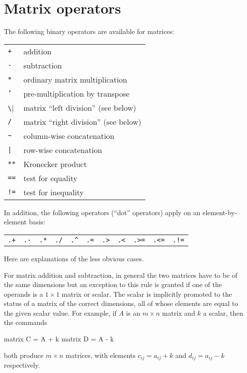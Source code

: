 \section{Matrix operators}
\label{matrix-op}

The following binary operators are available for matrices:

\begin{center}
\begin{tabular}{ll}
\texttt{+}  & addition \\
\texttt{-}  & subtraction \\
\texttt{*}  & ordinary matrix multiplication \\
\texttt{'}  & pre-multiplication by transpose \\
\verb|\|    & matrix ``left division'' (see below) \\
\texttt{/}  & matrix ``right division'' (see below) \\
\verb+~+    & column-wise concatenation \\
\verb+|+    & row-wise concatenation \\
\texttt{**} & Kronecker product \\
\texttt{==}  & test for equality \\
\texttt{!=} & test for inequality
\end{tabular}
\end{center}

In addition, the following operators (``dot'' operators) apply on an
element-by-element basis:

\begin{center}
\begin{tabular}{ccccccccccc}
\texttt{.+}  &  \texttt{.-}  &
\texttt{.*}  &  \texttt{./}  &  \verb+.^+  &
\texttt{.=}  &  \texttt{.>}  &  \texttt{.<} &
\texttt{.>=}  &  \texttt{.<=} & \texttt{.!=}
\end{tabular}
\end{center}

Here are explanations of the less obvious cases. 

For matrix addition and subtraction, in general the two matrices have
to be of the same dimensions but an exception to this rule is granted
if one of the operands is a $1\times 1$ matrix or scalar.  The scalar
is implicitly promoted to the status of a matrix of the correct
dimensions, all of whose elements are equal to the given scalar value.
For example, if $A$ is an $m \times n$ matrix and $k$ a scalar, then
the commands
%
\begin{code}
matrix C = A + k
matrix D = A - k
\end{code}
%
both produce $m \times n$ matrices, with elements $c_{ij} = 
a_{ij} + k$ and $d_{ij} = a_{ij} - k$ respectively.

